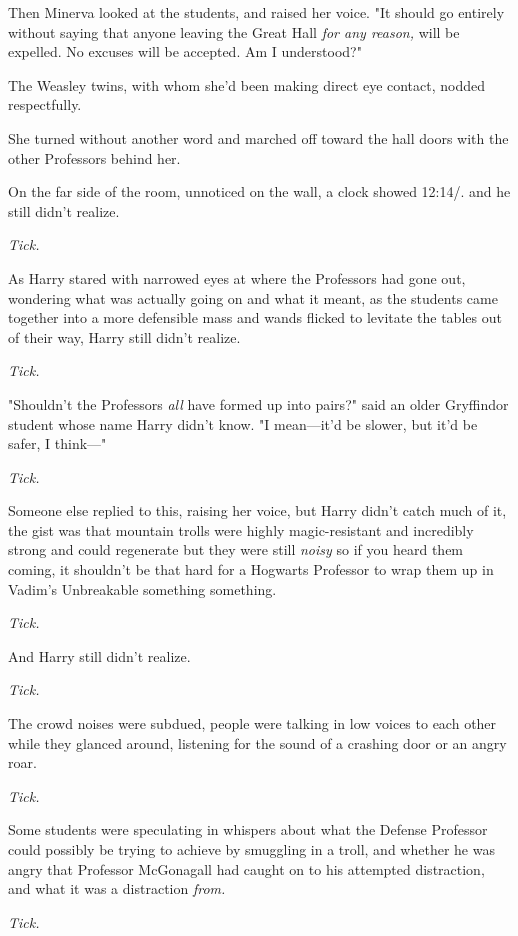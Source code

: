Then Minerva looked at the students, and raised her voice. "It should go
entirely without saying that anyone leaving the Great Hall \emph{for any
reason,} will be expelled. No excuses will be accepted. Am I understood?"

The Weasley twins, with whom she'd been making direct eye contact, nodded
respectfully.

She turned without another word and marched off toward the hall doors with the
other Professors behind her.

On the far side of the room, unnoticed on the wall, a clock showed 12:14\PM/.
\sbreak
{\el} and he still didn't realize.

\emph{Tick.}

As Harry stared with narrowed eyes at where the Professors had gone out,
wondering what was actually going on and what it meant, as the students came
together into a more defensible mass and wands flicked to levitate the tables
out of their way, Harry still didn't realize.

\emph{Tick.}

"Shouldn't the Professors \emph{all} have formed up into pairs?" said an older
Gryffindor student whose name Harry didn't know. "I mean---it'd be slower, but
it'd be safer, I think\mbox{---}"

\emph{Tick.}

Someone else replied to this, raising her voice, but Harry didn't catch much of
it, the gist was that mountain trolls were highly magic-resistant and
incredibly strong and could regenerate but they were still \emph{noisy} so if
you heard them coming, it shouldn't be that hard for a Hogwarts Professor to
wrap them up in Vadim's Unbreakable something something.

\emph{Tick.}

And Harry still didn't realize.

\emph{Tick.}

The crowd noises were subdued, people were talking in low voices to each other
while they glanced around, listening for the sound of a crashing door or an
angry roar.

\emph{Tick.}

Some students were speculating in whispers about what the Defense Professor
could possibly be trying to achieve by smuggling in a troll, and whether he was
angry that Professor McGonagall had caught on to his attempted distraction, and
what it was a distraction \emph{from.}

\emph{Tick.}

